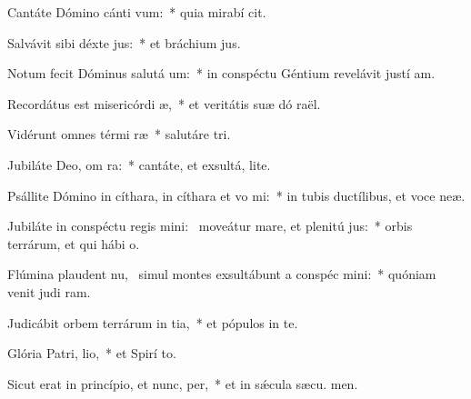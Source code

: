 \item Cantáte Dómino cánti vum:~* quia mirabí cit.
\item Salvávit sibi déxte jus:~* et bráchium  jus.
\item Notum fecit Dóminus salutá um:~* in conspéctu Géntium revelávit justí am.
\item Recordátus est misericórdi æ,~* et veritátis suæ dó raël.
\item Vidérunt omnes térmi ræ~* salutáre  tri.
\item Jubiláte Deo, om ra:~* cantáte, et exsultá,  lite.
\item Psállite Dómino in cíthara, in cíthara et vo mi:~* in tubis ductílibus, et voce  neæ.
\item Jubiláte in conspéctu regis mini:~\pscross{} moveátur mare, et plenitú jus:~* orbis terrárum, et qui hábi  o.
\item Flúmina plaudent nu,~\pscross{} simul montes exsultábunt a conspéc mini:~* quóniam venit judi ram.
\item Judicábit orbem terrárum in tia,~* et pópulos in te.
\item Glória Patri,  lio,~* et Spirí to.
\item Sicut erat in princípio, et nunc,  per,~* et in sǽcula sæcu. men.
